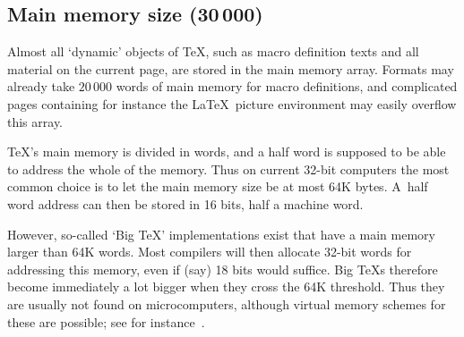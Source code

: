 \subsection{Main memory size (30$\,$000)}

Almost all `dynamic' objects of \TeX, such as macro definition
texts and all material on the current page, 
are stored in the main memory array. 
Formats may already take $20\,000$ words of
main memory for macro definitions, and complicated pages containing
for instance the \LaTeX\ picture environment may easily
overflow this array. 

\TeX's main memory is divided in words, and a half word
is supposed to be able to address the whole of the memory.
Thus on current 32-bit computers the most common choice
is to let the main memory size be at most 64K bytes.
A~half word address can then be stored in 16 bits,
half a machine word.

However, so-called `Big \TeX' implementations exist
that have a main memory larger than 64K words.
Most compilers will then allocate  32-bit words for
addressing this memory, even if (say) 18 bits would
suffice. Big \TeX s therefore become immediately
a lot bigger when they cross the 64K threshold.
Thus they are usually not found on microcomputers,
although virtual memory schemes for these are possible;
see for instance~\cite{Thull}.

